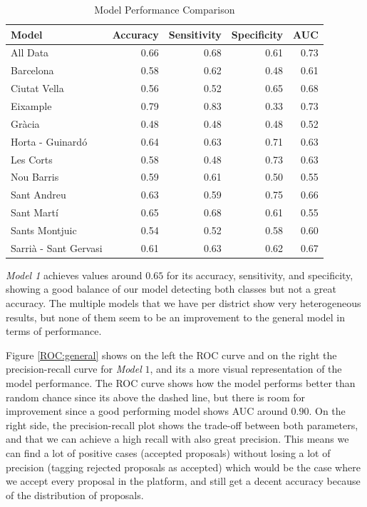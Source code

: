 \begin{table}[t]
\centering
\caption{Model Performance Comparison}
\label{performance}
\begin{tabular}{l | r r r | r}
\toprule
Model & Accuracy & Sensitivity & Specificity & AUC \\
\midrule
All Data & 0.66 &0.68 & 0.61 & 0.73 \\
\midrule
Barcelona & 0.58 & 0.62 & 0.48 & 0.61 \\
Ciutat Vella & 0.56 &0.52 & 0.65 & 0.68 \\
Eixample & 0.79 & 0.83 & 0.33 & 0.73\\
Gr\`acia & 0.48 & 0.48 & 0.48 & 0.52\\
Horta - Guinard\'o & 0.64 & 0.63 & 0.71 & 0.63 \\
Les Corts & 0.58 & 0.48 & 0.73 & 0.63 \\
Nou Barris & 0.59 & 0.61 & 0.50 & 0.55 \\
Sant Andreu & 0.63 & 0.59 & 0.75 & 0.66 \\
Sant Mart\'i & 0.65 & 0.68 & 0.61 & 0.55 \\
Sants Montjuic & 0.54 & 0.52 & 0.58 & 0.60 \\
Sarri\`a - Sant Gervasi & 0.61 & 0.63 & 0.62 & 0.67 \\
\bottomrule
\end{tabular}
\end{table}

\emph{Model 1} achieves values around $0.65$ for its accuracy, sensitivity, and specificity, showing a good balance of our model detecting both classes but not a great accuracy. The multiple models that we have per district show very heterogeneous results, but none of them seem to be an improvement to the general model in terms of performance. 

Figure \ref{ROC:general} shows on the left the ROC curve and on the right the precision-recall curve for \emph{Model} $1$, and its a more visual representation of the model performance. The ROC curve shows how the model performs better than random chance since its above the dashed line, but there is room for improvement since a good performing model shows AUC around $0.90$. On the right side, the precision-recall plot shows the trade-off between both parameters, and that we can achieve a high recall with also great precision. This means we can find a lot of positive cases (accepted proposals) without losing a lot of precision (tagging rejected proposals as accepted) which would be the case where we accept every proposal in the platform, and still get a decent accuracy because of the distribution of proposals. 

